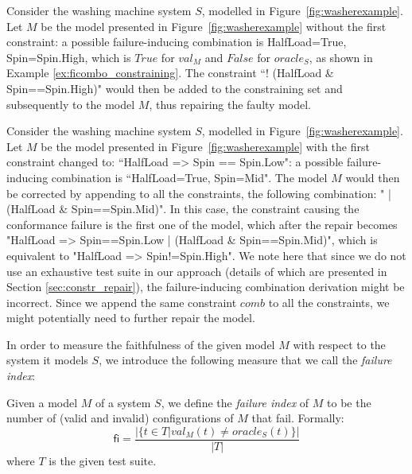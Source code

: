 \begin{tikzborder}{\cite{Gargantini16:validation}}
\begin{tikzborder}{\cite{gargantini_combinatorial_2017}}
\begin{example}\label{ex:constraining}
	Consider the washing machine system $S$, modelled in Figure~\ref{fig:washerexample}. Let $M$ be the model presented in Figure~\ref{fig:washerexample} without the first constraint: a possible failure-inducing combination is \textsf{HalfLoad=True, Spin=Spin.High}, which is $\mathit{True}$ for $val_M$ and $\mathit{False}$ for $\mathit{oracle}_{S}$, as shown in Example \ref{ex:ficombo_constraining}. 
	The constraint ``\textsf{! (HalfLoad \& Spin==Spin.High)}" would then be added to the constraining set and subsequently to the model $M$, thus repairing the faulty model.
\end{example}
\begin{example}\label{ex:relaxing}
	Consider the washing machine system $S$, modelled in Figure~\ref{fig:washerexample}. Let $M$ be the model presented in Figure~\ref{fig:washerexample} with the first constraint changed to: ``\textsf{HalfLoad => Spin == Spin.Low}": a possible failure-inducing combination 
	is ``\textsf{HalfLoad=True, Spin=Mid}".
	The model $M$ would then be corrected by appending to all the constraints, the following combination: "\textsf{ | (HalfLoad \& Spin==Spin.Mid)}". In this case, the constraint causing the conformance failure is the first one of the model, which after the repair becomes "\textsf{HalfLoad => Spin==Spin.Low | (HalfLoad \& Spin==Spin.Mid)}", which is equivalent to "\textsf{HalfLoad => Spin!=Spin.High}". We note here that since we do not use an exhaustive test suite in our approach (details of which are presented in Section \ref{sec:constr_repair}),  the failure-inducing combination derivation might be incorrect.
	Since we append the same constraint $comb$ to all the constraints, we might potentially need to further repair the model.
\end{example}

In order to measure the faithfulness of the given model $M$ with respect to the system it models $S$, we introduce the following measure that we call the \emph{failure index}:

\begin{defn}\label{def:failureindex}
	Given a model $M$ of a system $S$, we define the \emph{failure index} of $M$ to be the number of (valid and invalid) configurations of $M$ that fail. Formally:
	\[\mathsf{fi}=\frac{|\{t\in T | val_{M}(t)\neq \mathit{oracle}_{S}(t)\}|}{|T|}\]
	where $T$ is the given test suite. %
\end{defn}
\be


\end{tikzborder}
\end{tikzborder}
